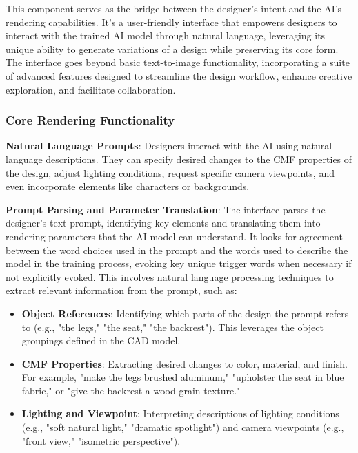 \documentclass{article}
\begin{document}
This component serves as the bridge between the designer's intent and the AI's rendering capabilities. It's a user-friendly interface that empowers designers to interact with the trained AI model through natural language, leveraging its unique ability to generate variations of a design while preserving its core form. The interface goes beyond basic text-to-image functionality, incorporating a suite of advanced features designed to streamline the design workflow, enhance creative exploration, and facilitate collaboration.

\subsubsection{Core Rendering Functionality}

\textbf{Natural Language Prompts}: Designers interact with the AI using natural language descriptions. They can specify desired changes to the CMF properties of the design, adjust lighting conditions, request specific camera viewpoints, and even incorporate elements like characters or backgrounds. 

\textbf{Prompt Parsing and Parameter Translation}: The interface parses the designer's text prompt, identifying key elements and translating them into rendering parameters that the AI model can understand. It looks for agreement between the word choices used in the prompt and the words used to describe the model in the training process, evoking key unique trigger words when necessary if not explicitly evoked. This involves natural language processing techniques to extract relevant information from the prompt, such as:

\begin{itemize}
\item \textbf{Object References}: Identifying which parts of the design the prompt refers to (e.g., "the legs," "the seat," "the backrest"). This leverages the object groupings defined in the CAD model.
\item \textbf{CMF Properties}: Extracting desired changes to color, material, and finish. For example, "make the legs brushed aluminum," "upholster the seat in blue fabric," or "give the backrest a wood grain texture."
\item \textbf{Lighting and Viewpoint}: Interpreting descriptions of lighting conditions (e.g., "soft natural light," "dramatic spotlight") and camera viewpoints (e.g., "front view," "isometric perspective").
\end{itemize}
\end{document}
